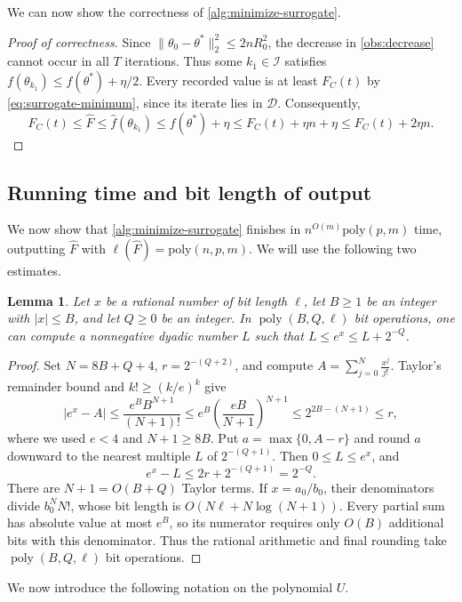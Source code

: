 \documentclass[11pt,reqno,letterpaper]{amsart}
\numberwithin{equation}{section}
\newtheorem{lemma}[lemma]{Lemma}
\theoremstyle{definition}
\theoremstyle{remark}
\begin{document}
We can now show the correctness of \cref{alg:minimize-surrogate}.

\begin{proof}[Proof of correctness]
Since $\|\theta_0-\theta^*\|_2^2\le2nR_0^2$, the decrease in
\cref{obs:decrease} cannot occur in all $T$ iterations.
Thus some $k_1\in\mathcal I$ satisfies
$f(\theta_{k_1})\le f(\theta^*)+\eta/2$.
Every recorded value is at least $F_C(t)$ by
\cref{eq:surrogate-minimum}, since its iterate lies in $\mathcal D$.
Consequently,
\[
 F_C(t)\le\widehat F\le\widehat f(\theta_{k_1})
 \le f(\theta^*)+\eta
 \le F_C(t)+\eta n+\eta\le F_C(t)+2\eta n.
\]
\end{proof}

\subsection{Running time and bit length of output}

We now show that \cref{alg:minimize-surrogate} finishes in $n^{O(m)}\text{poly}(p,m)$ time, outputting $\widehat F$ with $\ell(\widehat F)=\text{poly}(n,p,m)$.
We will use the following two estimates.

\begin{lemma}\label{lem:exponential-enclosures}
Let $x$ be a rational number of bit length $\ell$, let $B\ge1$ be an
integer with $|x|\le B$, and let $Q\ge0$ be an integer. In
$\operatorname{poly}(B,Q,\ell)$ bit operations, one can compute a
nonnegative dyadic number $L$ such that $ L\le e^x\le L+2^{-Q}$.
\end{lemma}

\begin{proof}
Set $N=8B+Q+4$, $r=2^{-(Q+2)}$, and compute $ A=\sum_{j=0}^{N}\frac{x^j}{j!}$.
Taylor's remainder bound and $k!\ge(k/e)^k$ give
\[
 |e^x-A|
 \le \frac{e^B B^{N+1}}{(N+1)!}
 \le e^B\left(\frac{eB}{N+1}\right)^{N+1}
 \le 2^{2B-(N+1)}
 \le r,
\]
where we used $e<4$ and $N+1\ge8B$.
Put $a=\max\{0,A-r\}$ and round $a$ downward to the nearest
multiple $L$ of $2^{-(Q+1)}$. Then $0\le L\le e^x$, and
\[
 e^x-L\le 2r+2^{-(Q+1)}=2^{-Q}.
\]
There are $N+1=O(B+Q)$ Taylor terms. If $x=a_0/b_0$, their
denominators divide $b_0^N N!$, whose bit length is
$O(N\ell+N\log(N+1))$. Every partial sum has absolute value
at most $e^B$, so its numerator requires only $O(B)$
additional bits with this denominator. Thus the rational
arithmetic and final rounding take
$\operatorname{poly}(B,Q,\ell)$ bit operations.
\end{proof}

We now introduce the following notation on the polynomial $U$.
\end{document}
